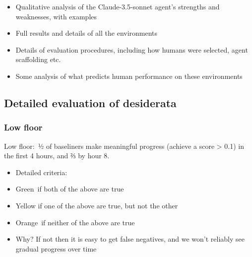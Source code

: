 \documentclass[
]{article}
\providecommand{\tightlist}{%
  \setlength{\itemsep}{0pt}\setlength{\parskip}{0pt}}
\begin{document}
\begin{itemize}
\tightlist
\item
  {Qualitative analysis of the Claude-3.5-sonnet agent's strengths and
  weaknesses, with examples}
\item
  {Full results and details of all the environments}
\item
  {Details of evaluation procedures, including how humans were selected,
  agent scaffolding etc.}
\item
  {Some analysis of what predicts human performance on these
  environments}
\end{itemize}

\subsection{\texorpdfstring{{Detailed evaluation of
desiderata}}{Detailed evaluation of desiderata}}\label{h.fgvmd6ojatwf}

\subsubsection{\texorpdfstring{{Low
floor}}{Low floor}}\label{h.htw1exqgzby3}

{Low floor:}{~½ of baseliners make meaningful progress (achieve a score
\textgreater{} 0.1) in the first 4 hours, and ⅔ by hour 8. }

\begin{itemize}
\tightlist
\item
  {Detailed criteria: }
\end{itemize}

\begin{itemize}
\tightlist
\item
  {Green}{~if both of the above are true}
\item
  {Yellow }{if one of the above are true, but not the other}
\item
  {Orange}{~if neither of the above are true}
\end{itemize}

\begin{itemize}
\tightlist
\item
  {Why? If not then it is easy to get false negatives, and we won't
  reliably see gradual progress over time}
\end{itemize}

{}

{}
\end{document}
